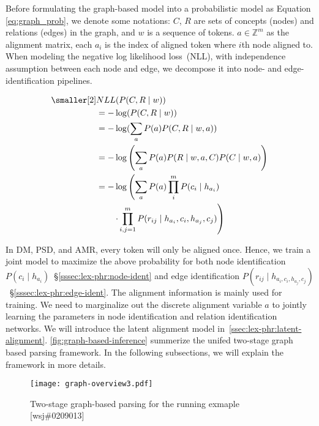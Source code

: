 Before formulating the graph-based model into a probabilistic model as
Equation \ref{eq:graph_prob}, we denote some notations: $C$, $R$ are
sets of concepts (nodes) and relations (edges) in the graph, and $w$
is a sequence of tokens.  $a \in {\mathbb{Z}}^m$ as the alignment
matrix, each $a_{i}$ is the index of aligned token where $i$th node
aligned to. When modeling the negative log likelihood loss~(NLL), with
independence assumption between each node and edge, we decompose it
into node- and edge-identification pipelines.

\begin{equation}
  \label{eq:graph_prob}
\begin{aligned} \smaller[2]
 & NLL(P(C,R \mid w)) \\
 & = - \log(P(C,R \mid w)) \\
 & = - \log(\sum_{a}{P(a) P(C,R \mid w,a)}) \\
 & = - \log\left(\sum_{a}P(a) P(R\mid w,a,C) P(C \mid w, a)\right) \\
 & = - \log\left(\sum_{a}P(a) \prod_{i}^{m} P(c_{i} \mid h_{a_{i}}) \right. \\
 & \qquad \left.\cdot \prod_{i,j=1}^{m}P(r_{ij} \mid h_{a_{i}}, c_{i}, h_{a_{j}}, c_{j})\right)
\end{aligned}
\end{equation}

In DM, PSD, and AMR, every token will only be aligned once.  Hence, we
train a joint model to maximize the above probability for both node
identification
$P(c_{i} \mid h_{a_{i}})$~\S\ref{sssec:lex-phr:node-ident} and edge
identification
$P(r_{ij} \mid h_{{a_{i}}, c_{i},h_{a_{j}},
  c_{j}})$~\S\ref{sssec:lex-phr:edge-ident}. The alignment
information is mainly used for training. We need to marginalize out
the discrete alignment variable $a$ to jointly learning the parameters
in node identification and relation identification networks. We will
introduce the latent alignment model
in~\autoref{ssec:lex-phr:latent-alignment}. \autoref{fig:graph-based-inference}
summerize the unifed two-stage graph based parsing framework. In the
following subsections, we will explain the framework in more details.

\begin{figure}[h] \centering
  \texttt{[image: graph-overview3.pdf]}
  \caption{\label{fig:graph-based-inference} Two-stage graph-based
    parsing for the running exmaple [wsj\#0209013]}
\end{figure}

